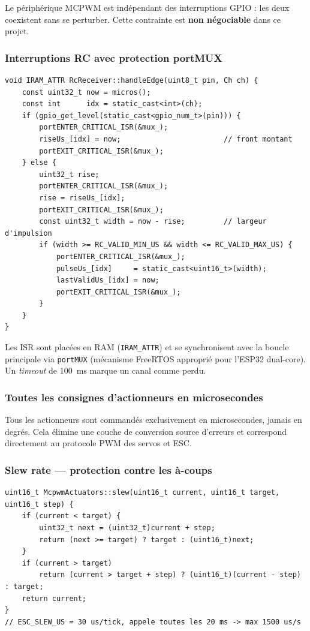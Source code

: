 \documentclass[12pt,a4paper]{article}
\begin{document}
Le p\'eriph\'erique MCPWM est ind\'ependant des interruptions GPIO : les deux
coexistent sans se perturber. Cette contrainte est \textbf{non n\'egociable} dans ce
projet.

\subsubsection{Interruptions RC avec protection portMUX}

\begin{lstlisting}[style=cpp, caption={RcReceiver.cpp -- ISR et section critique}]
void IRAM_ATTR RcReceiver::handleEdge(uint8_t pin, Ch ch) {
    const uint32_t now = micros();
    const int      idx = static_cast<int>(ch);
    if (gpio_get_level(static_cast<gpio_num_t>(pin))) {
        portENTER_CRITICAL_ISR(&mux_);
        riseUs_[idx] = now;                        // front montant
        portEXIT_CRITICAL_ISR(&mux_);
    } else {
        uint32_t rise;
        portENTER_CRITICAL_ISR(&mux_);
        rise = riseUs_[idx];
        portEXIT_CRITICAL_ISR(&mux_);
        const uint32_t width = now - rise;         // largeur d'impulsion
        if (width >= RC_VALID_MIN_US && width <= RC_VALID_MAX_US) {
            portENTER_CRITICAL_ISR(&mux_);
            pulseUs_[idx]     = static_cast<uint16_t>(width);
            lastValidUs_[idx] = now;
            portEXIT_CRITICAL_ISR(&mux_);
        }
    }
}
\end{lstlisting}

Les ISR sont plac\'ees en RAM (\texttt{IRAM\_ATTR}) et se synchronisent avec la
boucle principale via \texttt{portMUX} (m\'ecanisme FreeRTOS appropri\'e pour l'ESP32
dual-core). Un \emph{timeout} de 100~ms marque un canal comme perdu.

\subsubsection{Toutes les consignes d'actionneurs en microsecondes}

Tous les actionneurs sont command\'es exclusivement en microsecondes, jamais en
degr\'es. Cela \'elimine une couche de conversion source d'erreurs et correspond
directement au protocole PWM des servos et ESC.

\subsubsection{Slew rate --- protection contre les à-coups}

\begin{lstlisting}[style=cpp, caption={McpwmActuators.cpp -- limitation de variation}]
uint16_t McpwmActuators::slew(uint16_t current, uint16_t target, uint16_t step) {
    if (current < target) {
        uint32_t next = (uint32_t)current + step;
        return (next >= target) ? target : (uint16_t)next;
    }
    if (current > target)
        return (current > target + step) ? (uint16_t)(current - step) : target;
    return current;
}
// ESC_SLEW_US = 30 us/tick, appele toutes les 20 ms -> max 1500 us/s
\end{lstlisting}
\end{document}
